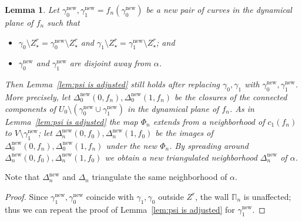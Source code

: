 \documentclass[]{amsart}
\newcommand{\bDelta}{{\mathbb{\Delta}}}
\newcommand{\bPi}{{\mathbb{\Pi}}}
\newcommand{\str}{{\star}}
\newcommand\new{{\operatorname{new}}}
\newtheorem{lem}[thm]{Lemma}
\theoremstyle{remark}
\numberwithin{equation}{section}
\theoremstyle{definition}
\begin{document}
\begin{lem}
\label{lem:gam1 rotate}
 Let $\gamma_0^\new, \gamma_1^\new=f_n(\gamma_0^\new)$ be a new pair of curves in the dynamical plane of $f_n$ such that
\begin{itemize}
\item $\gamma_0\setminus Z^r_\str=\gamma_0^\new \setminus Z^r_\str$ and $\gamma_1\setminus Z^r_\str=\gamma_1^\new \setminus Z^r_\str$; and
\item $\gamma_0^\new$ and $\gamma_1^\new$ are disjoint away from $\alpha$. 
\end{itemize}

Then Lemma~\ref{lem:psi is adjusted} still holds after replacing $\gamma_0,\gamma_1$ with $\gamma^\new_0,\gamma_1^\new$. More precisely, let $\Delta^\new_0(0,f_n),\Delta_0^\new(1,f_n)$ be the closures of the connected components of $U_0\setminus (\gamma^\new_0\cup \gamma^\new_1)$ in the dynamical plane of $f_n$. As in Lemma~\ref{lem:psi is adjusted} the map $\Phi_n$ extends from a neighborhood of $c_1(f_n)$ to $V\setminus \gamma_1^\new$; let $\Delta^\new_n(0,f_0),\Delta_n^\new(1,f_0)$ be the images of $\Delta^\new_0(0,f_n),\Delta_0^\new(1,f_n)$ under the new $\Phi_n$. By spreading around $\Delta^\new_n(0,f_0),\Delta_n^\new(1,f_0)$  we obtain a new triangulated neighborhood $\bDelta_n^\new$ of $\alpha$. 
\end{lem}
\noindent Note that $\bDelta_n^\new$ and $\bDelta_n$ triangulate the same neighborhood of $\alpha$. 
\begin{proof}
Since $\gamma^\new_1,\gamma^\new_0$ coincide with $\gamma_1,\gamma_0$ outside $Z^r$, the wall $\bPi_n$ is unaffected; thus we can repeat the proof of Lemma~\ref{lem:psi is adjusted} for $\gamma^\new_1$.
\end{proof}
\end{document}
